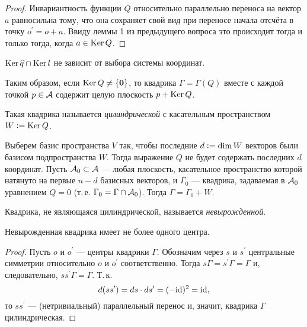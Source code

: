 \begin{proof}
    Инвариантность функции $Q$ относительно параллельно переноса на вектор $a$ равносильна тому, что она сохраняет свой вид при переносе начала отсчёта в точку $o^\prime = o + a$. Ввиду леммы 1 из предыдущего вопроса это происходит тогда и только тогда, когда $a \in \operatorname{Ker} Q$.
\end{proof}

\begin{corollary}
    $\operatorname{Ker} \widehat{q} \cap \operatorname{Ker} l$ не зависит от выбора системы координат.
\end{corollary}

Таким образом, если $\operatorname{Ker} Q \ne \{\boldsymbol{0}\}$, то квадрика $\Gamma = \Gamma(Q)$ вместе с каждой точкой $p \in \mathcal{A}$ содержит целую плоскость $p + \operatorname{Ker} Q$.

\begin{definition}
    Такая квадрика называется \textit{цилиндрической} с касательным пространством $W \vcentcolon = \operatorname{Ker} Q$.
\end{definition}

Выберем базис пространства $V$ так, чтобы последние $d \vcentcolon = \dim W$ векторов были базисом подпространства $W$. Тогда выражение $Q$ не будет содержать последних $d$ координат. Пусть $\mathcal{A}_0 \subset \mathcal{A}$ --- любая плоскость, касательное пространство которой натянуто на первые $n - d$ базисных векторов, и $\Gamma_0$ --- квадрика, задаваемая в $\mathcal{A}_0$ уравнением $Q = 0$ (т.\,е. $\Gamma_0 = \Gamma \cap \mathcal{A}_0$). Тогда $\Gamma = \Gamma_0 + W$.

\begin{definition}
    Квадрика, не являющаяся цилиндрической, называется \textit{невырожденной}.
\end{definition}

\begin{proposal}
    Невырожденная квадрика имеет не более одного центра.
\end{proposal}

\begin{proof}
    Пусть $o$ и $o^\prime$ --- центры квадрики $\Gamma$. Обозначим через $s$ и $s^\prime$ центральные симметрии относительно $o$ и $o^\prime$ соответственно. Тогда $s\Gamma = s^\prime\Gamma = \Gamma$ и, следовательно, $ss^\prime \Gamma = \Gamma$. Т.\,к.
    \[
        d(ss^\prime) = ds \cdot ds^\prime = (-\mathrm{id})^2 = \mathrm{id},
    \]
    то $ss^\prime$ --- (нетривиальный) параллельный перенос и, значит, квадрика $\Gamma$ цилиндрическая.
\end{proof}

